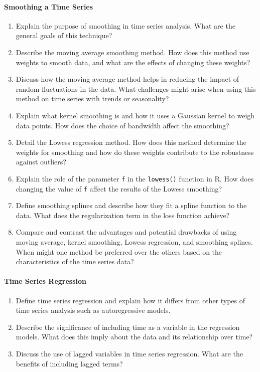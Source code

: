 \paragraph*{Smoothing a Time Series}
\begin{enumerate}
    \item Explain the purpose of smoothing in time series analysis. What are the general goals of this technique?
    \item Describe the moving average smoothing method. How does this method use weights to smooth data, and what are the effects of changing these weights?
    \item Discuss how the moving average method helps in reducing the impact of random fluctuations in the data. What challenges might arise when using this method on time series with trends or seasonality?
    \item Explain what kernel smoothing is and how it uses a Gaussian kernel to weigh data points. How does the choice of bandwidth affect the smoothing?
    \item Detail the Lowess regression method. How does this method determine the weights for smoothing and how do these weights contribute to the robustness against outliers?
    \item Explain the role of the parameter \texttt{f} in the \texttt{lowess()} function in R. How does changing the value of \texttt{f} affect the results of the Lowess smoothing?
    \item Define smoothing splines and describe how they fit a spline function to the data. What does the regularization term in the loss function achieve?
    \item Compare and contrast the advantages and potential drawbacks of using moving average, kernel smoothing, Lowess regression, and smoothing splines. When might one method be preferred over the others based on the characteristics of the time series data?
\end{enumerate}
\paragraph*{Time Series Regression}
\begin{enumerate}
    \item Define time series regression and explain how it differs from other types of time series analysis such as autoregressive models.
    \item Describe the significance of including time as a variable in the regression models. What does this imply about the data and its relationship over time?
    \item Discuss the use of lagged variables in time series regression. What are the benefits of including lagged terms?
\end{enumerate}
